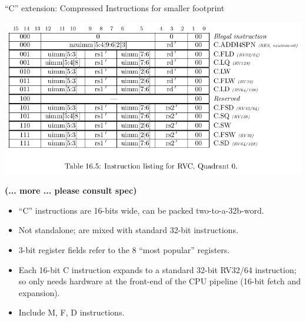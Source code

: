\documentclass{article}
\begin{document}
\clearpage


\begin{center}
  {\Huge
    ``C'' extension: Compressed Instructions for smaller footprint}

  \vspace*{0.2in}

  \includegraphics[width=7in]{Figs/UNPRIV_riscv-spec-20191213_p112_RVC_Q0.png}
                                    

  \vspace*{0.1in}

  {\large\bf (... more ... please consult spec)}

  \vspace*{0.3in}

  \begin{minipage}{9in}\LARGE
    \begin{itemize}
    \item ``C'' instructions are 16-bits wide, can be packed two-to-a-32b-word.

    \item Not standalone; are mixed with standard 32-bit instructions.

    \item 3-bit register fields refer to the 8 ``most popular'' registers.

    \item Each 16-bit C instruction expands to a standard 32-bit RV32/64
      instruction; so only needs hardware at the front-end of the CPU
      pipeline (16-bit fetch and expansion).

    \item Include M, F, D instructions.
    \end{itemize}
  \end{minipage}
\end{center}
\end{document}
